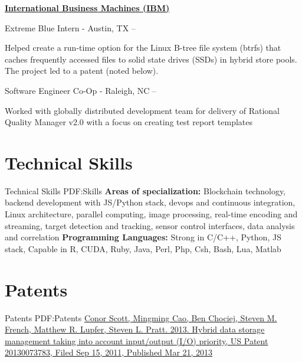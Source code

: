 \documentclass[a4paper,10pt,oneside]{article}
\begin{document}
\begin{minipage}[t][0pt]{\linewidth}
\begin{body}
\EntryGap

\href{www.ibm.com}
{\textbf{International Business Machines (IBM)}}
\par
Extreme Blue Intern - Austin, TX
\hfill
{} --
\begin{detail}
\BulletItem
Helped create a run-time option for the Linux B-tree file system (btrfs) that caches frequently accessed files to solid state drives (SSDs) in hybrid store pools. The project led to a patent (noted below). 
\end{detail}

\par
Software Engineer Co-Op - Raleigh, NC
\hfill
{} --
\begin{detail}
\BulletItem
Worked with globally distributed development team for delivery of Rational Quality Manager v2.0 with a focus on creating test report templates
\end{detail}


\section
{Technical Skills}
{Technical Skills}
{PDF:Skills}
\textbf{Areas of specialization:} Blockchain technology, backend development with JS/Python stack, devops and continuous integration, Linux architecture, parallel computing, image processing, real-time encoding and streaming, target detection and tracking, sensor control interfaces, data analysis and correlation
\newline
\textbf{Programming Languages:} Strong in C/C++, Python, JS stack, Capable in R, CUDA, Ruby, Java, Perl, Php, Csh, Bash, Lua, Matlab


\section
{Patents}
{Patents}
{PDF:Patents}
\href{https://www.google.com/patents/US20130073783}
{Conor Scott, Mingming Cao, Ben Chociej, Steven M. French, Matthew R. Lupfer, Steven L. Pratt. 2013. Hybrid data storage management taking into account input/output (I/O) priority, US Patent 20130073783, Filed Sep 15, 2011, Published Mar 21, 2013 }
\end{body}
\end{minipage}
\label{LastPage}
\end{document}
